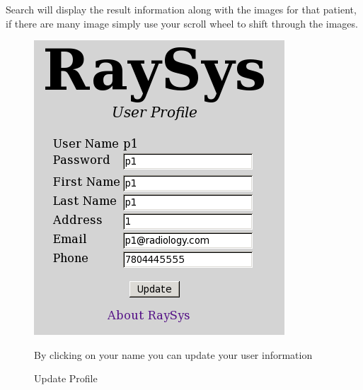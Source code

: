 \documentclass[11pt]{report}
\begin{document}
Search will display the result information along with the images for that patient, if there are many image simply use your scroll wheel to shift through the images.

\begin{figure}[htb]
  \begin{center}
    \includegraphics[scale=0.50]{imgs/profile1.png}
    \caption{Update Profile}
    \label{fig:prof1}
    \end{center}
    By clicking on your name you can update your user information
\end{figure}
\end{document}
